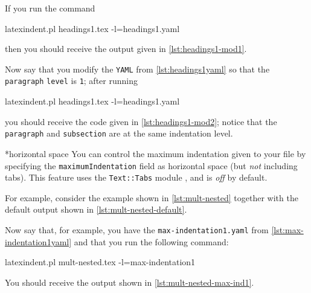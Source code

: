 	If you run the command
	\begin{commandshell}
latexindent.pl headings1.tex -l=headings1.yaml
\end{commandshell}
	then you should receive the output given in \cref{lst:headings1-mod1}.

	\begin{minipage}{.45\textwidth}
	\end{minipage}%
	\hfill
	\begin{minipage}{.45\textwidth}
	\end{minipage}

	Now say that you modify the \texttt{YAML} from \cref{lst:headings1yaml} so that the
	\texttt{paragraph} \texttt{level} is \texttt{1}; after running
	\begin{commandshell}
latexindent.pl headings1.tex -l=headings1.yaml
\end{commandshell}
	you should receive the code given in \cref{lst:headings1-mod2}; notice that the
	\texttt{paragraph} and \texttt{subsection} are at the same indentation level.


*{horizontal space}
	You can control the maximum indentation given to your file
	by%
	 specifying
	the \texttt{maximumIndentation} field as horizontal space (but \emph{not} including
	tabs). This feature uses the \texttt{Text::Tabs} module \cite{texttabs}, and is
	\emph{off} by default.

	For example, consider the example shown in \cref{lst:mult-nested} together with the
	default output shown in \cref{lst:mult-nested-default}.

	\begin{cmhtcbraster}[raster column skip=.1\linewidth]
	\end{cmhtcbraster}

	Now say that, for example, you have the \texttt{max-indentation1.yaml} from
	\cref{lst:max-indentation1yaml} and that you run the following command:
	\begin{commandshell}
latexindent.pl mult-nested.tex -l=max-indentation1
\end{commandshell}
	You should receive the output shown in \cref{lst:mult-nested-max-ind1}.

